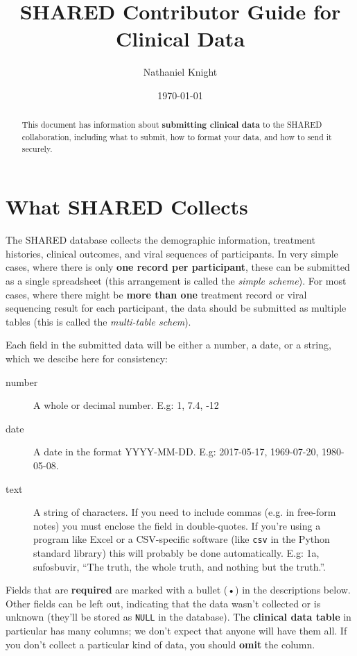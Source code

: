 \documentclass{article}
\author{Nathaniel Knight}
\date{\today}
\title{SHARED Contributor Guide for Clinical Data}
\begin{document}
\maketitle


\begin{abstract}
  This document has information about \textbf{submitting clinical
    data} to the SHARED collaboration, including what to submit, how to
  format your data, and how to send it securely.
\end{abstract}

\newpage

\section{What SHARED Collects}

The SHARED database collects the demographic information, treatment
histories, clinical outcomes, and viral sequences of participants. In
very simple cases, where there is only \textbf{one record per
  participant}, these can be submitted as a single spreadsheet (this
arrangement is called the \textit{simple scheme}). For most cases, where
there might be \textbf{more than one} treatment record or viral
sequencing result for each participant, the data should be submitted
as multiple tables (this is called the \textit{multi-table schem}).

Each field in the submitted data will be either a number, a date, or a
string, which we descibe here for consistency:

\begin{description}
\item[number] A whole or decimal number. E.g: 1, 7.4, -12
\item[date] A date in the format YYYY-MM-DD. E.g: 2017-05-17,
  1969-07-20, 1980-05-08.
\item[text] A string of characters. If you need to include commas
  (e.g. in free-form notes) you must enclose the field in
  double-quotes. If you're using a program like Excel or a
  CSV-specific software (like \texttt{csv} in the Python standard
  library) this will probably be done automatically. E.g: 1a,
  sufosbuvir, ``The truth, the whole truth, and nothing but the
  truth.''.
\end{description}

Fields that are \textbf{required} are marked with a bullet (•) in the
descriptions below.  Other fields can be left out, indicating that the
data wasn't collected or is unknown (they'll be stored as
\texttt{NULL} in the database). The \textbf{clinical data table} in
particular has many columns; we don't expect that anyone will have
them all. If you don't collect a particular kind of data, you should
\textbf{omit} the column.
\end{document}
